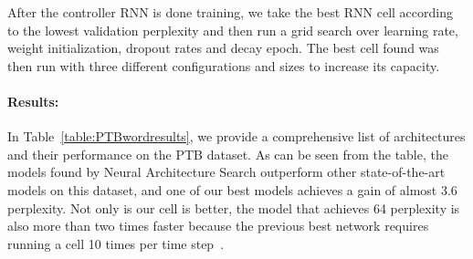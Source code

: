 \documentclass{article} \usepackage{iclr2017_conference,times}
\begin{document}
After the controller RNN is done training, we take the best RNN cell according to the lowest validation perplexity and then run a grid search over learning rate, weight initialization, dropout rates and decay epoch. The best cell found was then run with three different configurations and sizes to increase its capacity.

\paragraph{Results:} In Table~\ref{table:PTBwordresults}, we provide a comprehensive list of architectures and their performance on the PTB dataset. As can be seen from the table, the models found by Neural Architecture Search outperform other state-of-the-art models on this dataset, and one of our best models achieves a gain of almost 3.6 perplexity. Not only is our cell is better, the model that achieves 64 perplexity is also more than two times faster because the previous best network requires running a cell 10 times per time step~\citep{Zilly2016}. 
\end{document}
